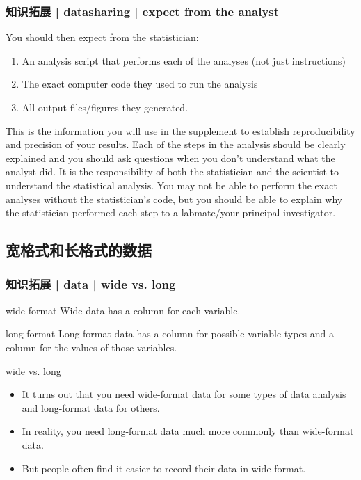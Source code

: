 \begin{frame}
  \frametitle{知识拓展 | datasharing | expect from the analyst}
  You should then expect from the statistician:
  \begin{enumerate}
    \item An analysis script that performs each of the analyses (not just instructions)
    \item The exact computer code they used to run the analysis
    \item All output files/figures they generated.
  \end{enumerate}
  This is the information you will use in the supplement to establish reproducibility and precision of your results. Each of the steps in the analysis should be clearly explained and you should ask questions when you don't understand what the analyst did. It is the responsibility of both the statistician and the scientist to understand the statistical analysis. You may not be able to perform the exact analyses without the statistician's code, but you should be able to explain why the statistician performed each step to a labmate/your principal investigator. 
\end{frame}

\subsection{宽格式和长格式的数据}
\begin{frame}
  \frametitle{知识拓展 | data | wide vs. long}
  \begin{block}{wide-format}
  Wide data has a column for each variable.
  \end{block}
  \pause
  \begin{block}{long-format}
  Long-format data has a column for possible variable types and a column for the values of those variables. 
  \end{block}
  \pause
  \begin{block}{wide vs. long}
    \begin{itemize}
      \item It turns out that you need wide-format data for some types of data analysis and long-format data for others.
      \item In reality, you need long-format data much more commonly than wide-format data.
      \item But people often find it easier to record their data in wide format.
    \end{itemize}
  \end{block}
\end{frame}

